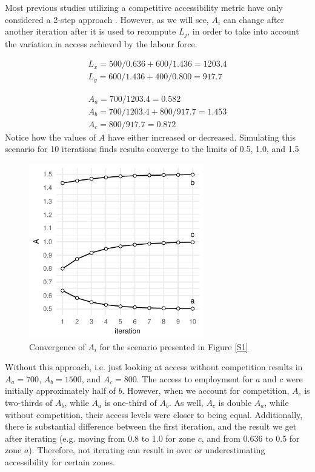 \documentclass[11 pt, letterpaper]{article}
\begin{document}
{Most previous studies utilizing a competitive accessibility metric have only considered a 2-step approach . However, as we will see, $A_i$ can change after another iteration after it is used to recompute $L_j$, in order to take into account the variation in access achieved by the labour force.

\begin{equation}
\begin{array}{l}
L_{x} = {500}/{0.636} + {600}/{1.436} = 1203.4 \\
L_{y} =  {600}/{1.436} + {400}/{0.800} = 917.7
\end{array}
\end{equation}

\begin{equation}
\begin{array}{l}
A_{a} = {700}/{1203.4} = 0.582 \\
A_{b} = {700}/{1203.4} + {800}/{917.7} = 1.453\\
A_{c} = {800}/{917.7} = 0.872
\end{array}
\end{equation}
Notice how the values of $A$ have either increased or decreased. Simulating this scenario for 10 iterations finds results converge to the limits of 0.5, 1.0, and 1.5

\vspace{4mm}

\begin{figure}[H]
	\caption{Convergence of $A_i$ for the scenario presented in Figure \ref{S1} }
	\label{S1c}
	\centerline{\includegraphics[width=3in]{figures/convg/conRS1.pdf}}
	\vspace{2mm}
\end{figure}

Without this approach, i.e. just looking at access without competition results in $A_{a} = 700$, $A_{b} = 1500$, and $A_{c} = 800$. The access to employment for $a$ and $c$ were initially approximately half of $b$. However, when we account for competition, $A_{c}$ is two-thirds of $A_b$, while $A_a$ is one-third of $A_b$. As well, $A_c$ is double $A_{a}$, while without competition, their access levels were closer to being equal. Additionally, there is substantial difference between the first iteration, and the result we get after iterating (e.g. moving from 0.8 to 1.0 for zone $c$, and from 0.636 to 0.5 for zone $a$). Therefore, not iterating can result in over or underestimating accessibility for certain zones.

}
\end{document}
